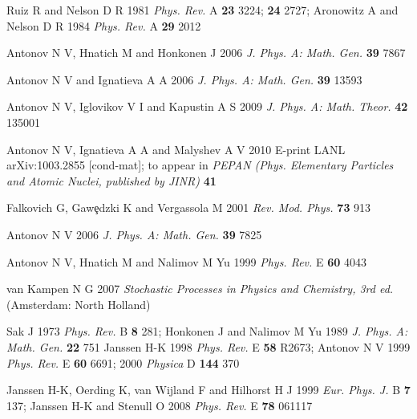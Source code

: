 \documentclass[12pt]{article}
\begin{document}
\begin{thebibliography}{99}
 Ruiz R and Nelson D R 1981 {\it Phys. Rev.} A {\bf 23}
3224; {\bf 24} 2727;
Aronowitz A and Nelson D R 1984 {\it Phys. Rev.} A {\bf 29} 2012

 Antonov N V, Hnatich M and Honkonen J 2006
{\it J. Phys. A: Math. Gen.} {\bf 39} 7867

 Antonov N V and Ignatieva A A 2006
{\it J. Phys. A: Math. Gen.} {\bf 39} 13593

 Antonov N V, Iglovikov V I and Kapustin A S 2009
{\it J. Phys. A: Math. Theor.} {\bf 42} 135001

 Antonov N V, Ignatieva A A and Malyshev A V 2010
E-print LANL arXiv:1003.2855 [cond-mat]; to appear in {\it PEPAN
(Phys. Elementary Particles and Atomic Nuclei, published by JINR)} {\bf 41}

 Falkovich G, Gaw\c{e}dzki K and Vergassola M  2001
{\it Rev. Mod. Phys.} {\bf 73} 913

 Antonov N V 2006 {\it J. Phys. A: Math. Gen.} {\bf 39} 7825

 Antonov N V, Hnatich M and Nalimov M Yu 1999
{\it Phys. Rev.} E {\bf 60} 4043

 van Kampen N G 2007 {\it Stochastic Processes in Physics
and Chemistry, 3rd ed.} (Amsterdam: North Holland)

 Sak J 1973 {\it Phys. Rev.} B {\bf 8} 281;
Honkonen J and Nalimov M Yu 1989 {\it J. Phys. A: Math. Gen.} {\bf 22} 751
Janssen H-K 1998 {\it Phys. Rev.} E {\bf 58} R2673;
Antonov N V 1999 {\it Phys. Rev.} E {\bf 60} 6691;
2000 {\it Physica} D {\bf 144} 370

 Janssen H-K, Oerding K, van Wijland F and Hilhorst H J
1999 {\it Eur. Phys. J.} B {\bf 7} 137; Janssen H-K and Stenull O 2008
{\it Phys. Rev.} E {\bf 78} 061117

\end{thebibliography}
\end{document}
